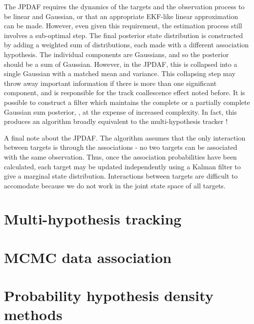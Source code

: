 The JPDAF requires the dynamics of the targets and the observation process to be linear and Gaussian, or that an appropriate EKF-like linear approximation can be made. However, even given this requirement, the estimation process still involves a sub-optimal step. The final posterior state distribution is constructed by adding a weighted sum of distributions, each made with a different association hypothesis. The individual components are Gaussians, and so the posterior should be a sum of Gaussian. However, in the JPDAF, this is collapsed into a single Gaussian with a matched mean and variance. This collapsing step may throw away important information if there is more than one significant component, and is responsible for the track coallescence effect noted before. It is possible to construct a filter which maintains the complete or a partially complete Gaussian sum posterior, \cite{Singer1974,Salmond1990}, at the expense of increased complexity. In fact, this produces an algorithm broadly equivalent to the multi-hypothesis tracker \cite{Blackman2004}!

A final note about the JPDAF. The algorithm assumes that the only interaction between targets is through the associations - no two targets can be associated with the same observation. Thus, once the association probabilities have been calculated, each target may be updated independently using a Kalman filter to give a marginal state distribution. Interactions between targets are difficult to accomodate because we do not work in the joint state space of all targets.



\section{Multi-hypothesis tracking}






\section{MCMC data association}

\section{Probability hypothesis density methods}

